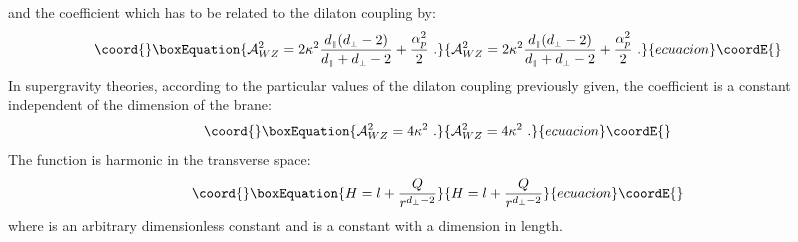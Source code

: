 \documentclass[a4paper,12pt]{article}
\def\dpar{d_{\scriptscriptstyle\parallel}}
\def\dperp{d_{\scriptscriptstyle\perp}}
\begin{document}
%
and the coefficient \coordHE{} which has to be related to the dilaton
coupling by:
%
\begin{equation}\coord{}\boxEquation{
	\label{eq:WZ}
{\cal A}_{WZ}^2 = 2 \kappa^2 \frac{\dpar(\dperp-2)}{\dpar+\dperp-2}
+ \frac{\alpha_p^2}{2} \ .
}{
	{\cal A}_{WZ}^2 = 2 \kappa^2 \frac{\dpar(\dperp-2)}{\dpar+\dperp-2}
+ \frac{\alpha_p^2}{2} \ .
}{ecuacion}\coordE{}\end{equation}
%
In supergravity theories, according to the particular values of the dilaton
coupling previously given, the coefficient \coordHE{} is a constant
independent of the dimension of the brane:
%
\begin{equation}\coord{}\boxEquation{
{\cal A}_{WZ}^2 = 4 \kappa^2 \ .
}{
{\cal A}_{WZ}^2 = 4 \kappa^2 \ .
}{ecuacion}\coordE{}\end{equation}
%
The function \coordHE{} is harmonic in the transverse space:
%
\begin{equation}\coord{}\boxEquation{
	\label{eq:H}
H =  l +  \frac{Q}{r^{\dperp-2}}
}{
	H =  l +  \frac{Q}{r^{\dperp-2}}
}{ecuacion}\coordE{}\end{equation}
%
where \coordHE{} is an arbitrary dimensionless constant and \coordHE{} is a constant with
a dimension \myHighlight{$\dperp-2$}\coordHE{} in length.
\end{document}
